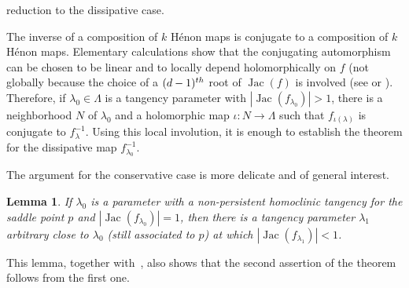 \documentclass[11pt, oneside]{amsart}
\newcommand{\abs}[1]{\left\vert#1\right\vert}
\newcommand{\la}{\lambda}
\newcommand{\lo}{{\lambda_0}}
\newcommand{\inv}{^{-1}}
\DeclareMathOperator{\jac}{Jac}
\newtheorem{lem}[prop] {Lemma}
\theoremstyle{remark}
\theoremstyle{definition}
\theoremstyle{theorem}
\newcommand{\commentaire}[1]{}
\begin{document}
  \medskip
  
  reduction to the dissipative case. \commentaire{New step for Major Remark \#3}
 
 The inverse of a composition of $k$ Hénon maps is conjugate to a composition of $k$ Hénon maps. 
Elementary calculations   show that the conjugating automorphism
 can be chosen to be linear and to locally depend holomorphically on $f$ (not globally because the choice of a $(d-1)^{\rm{th}}$ root of $\jac(f)$ is involved (see \cite[Thm. 2.6]{FM} or \cite[\S 6.1]{multipliers}). 
Therefore, if $\lambda_0\in \Lambda$ is a tangency parameter with $\abs{\jac(f_\lo)}>1$, 
there is a neighborhood $N$ of $\lo$ and 
a    holomorphic map $\iota:N\to \Lambda$    such that  
$f_{\iota(\lambda)}$ is conjugate to $f_\la\inv$. 
Using this local involution, 
it is enough to establish the theorem for the dissipative map $f_\lo\inv$. 

The argument for the conservative case is more delicate and of general interest. 

 
 \begin{lem}\label{lem:conservative}
 If $\lambda_0$ is a parameter with a non-persistent homoclinic 
 tangency for the saddle point $p$ 
 and $\abs{\jac(f_{\lambda_0})}=1$,  then there is a tangency 
 parameter $\lambda_1$ arbitrary close to $\lambda_0$ (still associated to $p$) at which 
 $\abs{\jac(f_{\lambda_1})}< 1$.  
 \end{lem}

This lemma, together with~\cite[Cor. 4.5]{tangencies}, also shows that the second assertion of the theorem follows from the first one.
\end{document}
